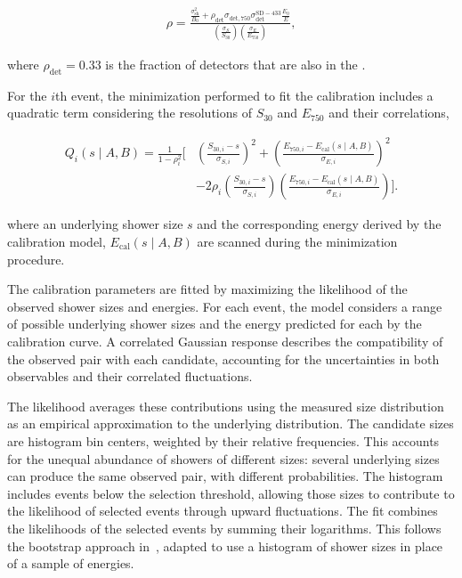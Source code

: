 \documentclass[main.tex]{subfiles}
\begin{document}
\begin{align}
    \rho
    =
    \frac{
        \displaystyle
        \frac{\sigma_{\mathrm{sh}}^2}{B_0}
        +
        \rho_{\mathrm{det}}
        \sigma_{\mathrm{det},750}
        \sigma_{\mathrm{det}}^{\mathrm{SD-433}}
        \frac{E_0}{E}
    }{
        \displaystyle
        \left(
            \frac{\sigma_{S}}{S_{30}}
        \right)
        \left(
            \frac{\sigma_{E}}{E_{750}}
        \right)
    },
\end{align}

where $\rho_{\mathrm{det}}=0.33$ is the fraction of  detectors that are also in the .


For the $i$\-th event, the minimization performed to fit the calibration includes a quadratic term considering the resolutions of $S_{30}$ and $E_{750}$ and their correlations,

\begin{align}
    Q_i(s\mid A,B)
    =
    \frac{1}{1-\rho_i^2}
    \Bigg[
        &
        \left(
            \frac{S_{30,i}-s}{\sigma_{S,i}}
        \right)^2
        +
        \left(
            \frac{
                E_{750,i}
                -
                E_{\mathrm{cal}}(s\mid A,B)
            }{\sigma_{E,i}}
        \right)^2
        \nonumber\\
        &
        -
        2\rho_i
        \left(
            \frac{S_{30,i}-s}{\sigma_{S,i}}
        \right)
        \left(
            \frac{
                E_{750,i}
                -
                E_{\mathrm{cal}}(s\mid A,B)
            }{\sigma_{E,i}}
        \right)
    \Bigg].
    \label{eq:calibration_mahalanobis}
\end{align}

where an underlying shower size $s$ and the corresponding energy derived by the calibration model, $E_{\mathrm{cal}}(s\mid A,B)$ are scanned during the minimization procedure.  

The calibration parameters are fitted by maximizing the likelihood of the observed shower sizes and  energies. For each event, the model considers a range of possible underlying shower sizes and the energy predicted for each by the calibration curve. A correlated Gaussian response describes the compatibility of the observed pair with each candidate, accounting for the uncertainties in both observables and their correlated fluctuations.

The likelihood averages these contributions using the measured size distribution as an empirical approximation to the underlying distribution. The candidate sizes are histogram bin centers, weighted by their relative frequencies. This accounts for the unequal abundance of showers of different sizes: several underlying sizes can produce the same observed pair, with different probabilities. The histogram includes events below the selection threshold, allowing those sizes to contribute to the likelihood of selected events through upward fluctuations. The fit combines the likelihoods of the selected events by summing their logarithms.
This follows the bootstrap approach in~\cite{Dembinski:2013:Unfolding}, adapted to use a histogram of shower sizes in place of a sample of energies.
\end{document}
